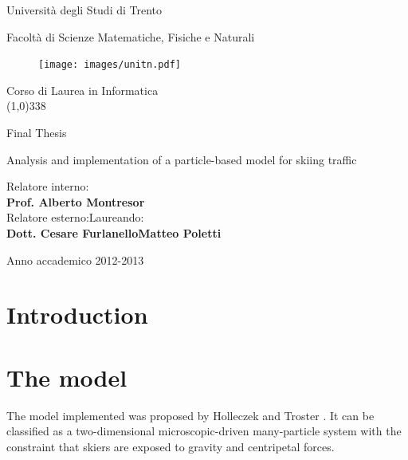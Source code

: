 \documentclass[12pt,a4paper,twoside]{book}
\begin{document}
\begin{titlepage}
  \begin{center}
    \begin{Large}Universit\`a degli Studi di Trento\\\end{Large}
     Facolt\`a di Scienze Matematiche, Fisiche e Naturali\\
     \vspace{10pt}
     \begin{figure}[htbp]
       \begin{center}
         \texttt{[image: images/unitn.pdf]}
       \end{center}
     \end{figure}
Corso di Laurea in Informatica\\

\vspace{10pt}
\line(1,0){338}
\vspace{10pt}

Final Thesis\\
\end{center}
\vspace{3cm}
\begin{center}
\begin{Large}Analysis and implementation of a particle-based model for skiing traffic\\\end{Large}
\vspace{3cm}
\end{center}
Relatore interno: \\ \textbf{Prof. Alberto Montresor} \\
Relatore esterno:\hspace{6.8cm}Laureando:   \\
\textbf{Dott. Cesare Furlanello}\hspace{4.9cm}\textbf{Matteo Poletti}
\vspace{1cm}
\begin{center}
Anno accademico 2012-2013
\end{center}
\end{titlepage}
\tableofcontents
\chapter*{Introduction}


\chapter{The model}\label{model}
The model implemented was proposed by Holleczek and Troster \cite{hol2012}. It can be classified as a two-dimensional microscopic-driven many-particle system with the constraint that skiers are exposed to gravity and centripetal forces.
\end{document}
